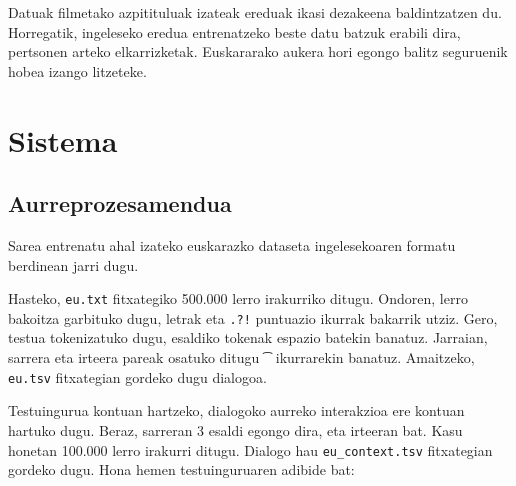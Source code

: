 \documentclass[11pt,a4paper]{article}
\begin{document}
Datuak filmetako azpitituluak izateak ereduak ikasi dezakeena baldintzatzen du. Horregatik, ingeleseko eredua entrenatzeko beste datu batzuk erabili dira, pertsonen arteko elkarrizketak. Euskararako aukera hori egongo balitz seguruenik hobea izango litzeteke.

\section{Sistema}

\subsection{Aurreprozesamendua}

Sarea entrenatu ahal izateko euskarazko dataseta ingelesekoaren formatu berdinean jarri dugu.

Hasteko, \texttt{eu.txt} fitxategiko 500.000 lerro irakurriko ditugu. Ondoren, lerro bakoitza garbituko dugu, letrak eta \texttt{.?!} puntuazio ikurrak bakarrik utziz. Gero, testua tokenizatuko dugu, esaldiko tokenak espazio batekin banatuz. Jarraian, sarrera eta irteera pareak osatuko ditugu \texttt{\t} ikurrarekin banatuz. Amaitzeko, \texttt{eu.tsv} fitxategian gordeko dugu dialogoa. 

Testuingurua kontuan hartzeko, dialogoko aurreko interakzioa ere kontuan hartuko dugu. Beraz, sarreran 3 esaldi egongo dira, eta irteeran bat. Kasu honetan 100.000 lerro irakurri ditugu. Dialogo hau \texttt{eu\_context.tsv} fitxategian gordeko dugu. Hona hemen testuinguruaren adibide bat: 
\end{document}
